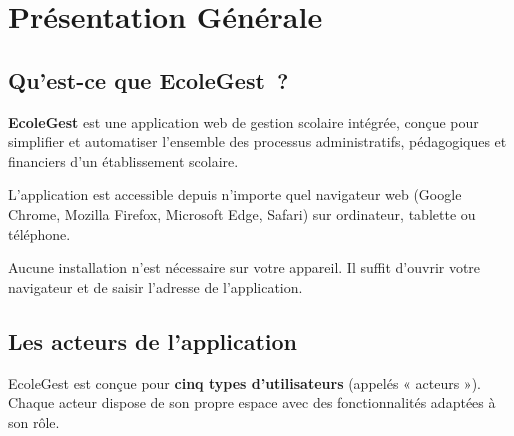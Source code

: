 \documentclass[12pt, a4paper, twoside, openright]{report}
\begin{document}
\clearpage

\tableofcontents
\clearpage

\listoffigures
\clearpage

\chapter{Présentation Générale}
\label{chap:presentation}

\section{Qu'est-ce que EcoleGest~?}

\textbf{EcoleGest} est une application web de gestion scolaire intégrée, conçue pour simplifier et automatiser l'ensemble des processus administratifs, pédagogiques et financiers d'un établissement scolaire.

L'application est accessible depuis n'importe quel navigateur web (Google Chrome, Mozilla Firefox, Microsoft Edge, Safari) sur ordinateur, tablette ou téléphone.

\begin{note}
  Aucune installation n'est nécessaire sur votre appareil. Il suffit d'ouvrir votre navigateur et de saisir l'adresse de l'application.
\end{note}

\section{Les acteurs de l'application}

EcoleGest est conçue pour \textbf{cinq types d'utilisateurs} (appelés « acteurs »). Chaque acteur dispose de son propre espace avec des fonctionnalités adaptées à son rôle.
\end{document}
